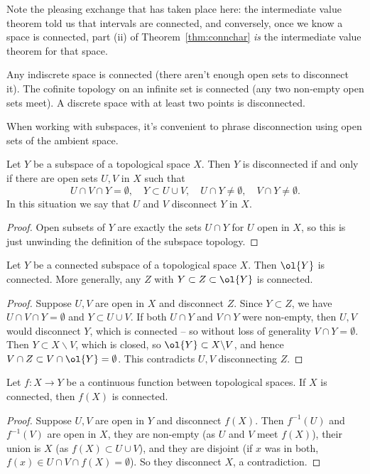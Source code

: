Note the pleasing exchange that has taken place here: the intermediate value theorem told us that intervals are connected, and conversely, once we know a space is connected, part (ii) of Theorem~\ref{thm:connchar} \emph{is} the intermediate value theorem for that space.

\begin{example}
    Any indiscrete space is connected (there aren't enough open sets to disconnect it). The cofinite topology on an infinite set is connected (any two non-empty open sets meet). A discrete space with at least two points is disconnected.
\end{example}

When working with subspaces, it's convenient to phrase disconnection using open sets of the ambient space.

\begin{lemma}
    Let $Y$ be a subspace of a topological space $X$. Then $Y$ is disconnected if and only if there are open sets $U, V$ in $X$ such that
    $$
    U \cap V \cap Y = \emptyset, \quad Y \subset U \cup V, \quad U \cap Y \neq \emptyset, \quad V \cap Y \neq \emptyset.
    $$
    In this situation we say that $U$ and $V$ disconnect $Y$ in $X$.
\end{lemma}
\begin{proof}
    Open subsets of $Y$ are exactly the sets $U \cap Y$ for $U$ open in $X$, so this is just unwinding the definition of the subspace topology.
\end{proof}

\begin{proposition}\label{prop:closureconn}
    Let $Y$ be a connected subspace of a topological space $X$. Then $\ol{Y}$ is connected. More generally, any $Z$ with $Y \subset Z \subset \ol{Y}$ is connected.
\end{proposition}
\begin{proof}
    Suppose $U, V$ are open in $X$ and disconnect $Z$. Since $Y \subset Z$, we have $U \cap V \cap Y = \emptyset$ and $Y \subset U \cup V$. If both $U \cap Y$ and $V \cap Y$ were non-empty, then $U, V$ would disconnect $Y$, which is connected -- so without loss of generality $V \cap Y = \emptyset$. Then $Y \subset X \backslash V$, which is closed, so $\ol{Y} \subset X \backslash V$, and hence $V \cap Z \subset V \cap \ol{Y} = \emptyset$. This contradicts $U, V$ disconnecting $Z$.
\end{proof}

\begin{theorem}
    Let $f: X \rightarrow Y$ be a continuous function between topological spaces. If $X$ is connected, then $f(X)$ is connected.
\end{theorem}
\begin{proof}
    Suppose $U, V$ are open in $Y$ and disconnect $f(X)$. Then $f^{-1}(U)$ and $f^{-1}(V)$ are open in $X$, they are non-empty (as $U$ and $V$ meet $f(X)$), their union is $X$ (as $f(X) \subset U \cup V$), and they are disjoint (if $x$ was in both, $f(x) \in U \cap V \cap f(X) = \emptyset$). So they disconnect $X$, a contradiction.
\end{proof}

